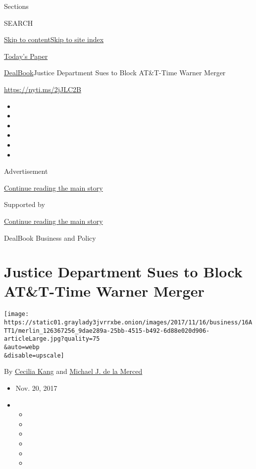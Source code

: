 Sections

SEARCH

\protect\hyperlink{site-content}{Skip to
content}\protect\hyperlink{site-index}{Skip to site index}

\href{https://myaccount.nytimes3xbfgragh.onion/auth/login?response_type=cookie\&client_id=vi}{}

\href{https://www.nytimes3xbfgragh.onion/section/todayspaper}{Today's
Paper}

\href{/section/business/dealbook}{DealBook}\textbar{}Justice Department
Sues to Block AT\&T-Time Warner Merger

\href{https://nyti.ms/2jJLC2B}{https://nyti.ms/2jJLC2B}

\begin{itemize}
\item
\item
\item
\item
\item
\item
\end{itemize}

Advertisement

\protect\hyperlink{after-top}{Continue reading the main story}

Supported by

\protect\hyperlink{after-sponsor}{Continue reading the main story}

DealBook Business and Policy

\hypertarget{justice-department-sues-to-block-att-time-warner-merger}{%
\section{Justice Department Sues to Block AT\&T-Time Warner
Merger}\label{justice-department-sues-to-block-att-time-warner-merger}}

\texttt{[image: https://static01.graylady3jvrrxbe.onion/images/2017/11/16/business/16ATT1/merlin\_126367256\_9dae289a-25bb-4515-b492-6d88e020d906-articleLarge.jpg?quality=75\\\&auto=webp\\\&disable=upscale]}

By \href{http://www.nytimes3xbfgragh.onion/by/cecilia-kang}{Cecilia
Kang} and
\href{http://www.nytimes3xbfgragh.onion/by/michael-j-de-la-merced}{Michael
J. de la Merced}

\begin{itemize}
\item
  Nov. 20, 2017
\item
  \begin{itemize}
  \item
  \item
  \item
  \item
  \item
  \item
  \end{itemize}
\end{itemize}

